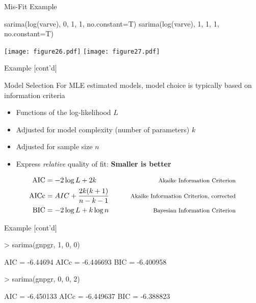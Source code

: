 \documentclass[ignorenonframetext,xcolor=x11names]{beamer}
\begin{document}
\begin{frame}[fragile]{Mis-Fit Example}
\begin{Rcode}
sarima(log(varve), 0, 1, 1, no.constant=T)
sarima(log(varve), 1, 1, 1, no.constant=T)
\end{Rcode}
\begin{center}
\texttt{[image: figure26.pdf]}
\texttt{[image: figure27.pdf]}
\end{center}
\end{frame}

\begin{frame}[fragile]{Example \small [cont'd]}
\begin{block}{Model Selection}
For MLE estimated models, model choice is typically based on information criteria
\begin{itemize}
   \item Functions of the log-likelihood $L$
   \item Adjusted for model complexity (number of parameters) $k$
   \item Adjusted for sample size $n$
   \item Express \emph{relative} quality of fit: \textbf{Smaller is better}
\end{itemize}
\begin{align*}
\operatorname{AIC} &= -2 \log L + 2k  &\qquad \text{\footnotesize Akaike Information Criterion}\\
\operatorname{AICc} &= AIC + \frac{2k(k+1)}{n-k-1} &\qquad \text{\footnotesize Akaike Information Criterion, corrected}\\
\operatorname{BIC} &= -2 \log L + k \log n &\qquad \text{\footnotesize Bayesian Information Criterion}
\end{align*}
\end{block}
\end{frame}

\begin{frame}[fragile]{Example \small [cont'd]}
\begin{textcode}
> sarima(gnpgr, 1, 0, 0)

AIC = -6.44694  AICc = -6.446693  BIC = -6.400958 
\end{textcode}

\begin{textcode}
> sarima(gnpgr, 0, 0, 2)

AIC = -6.450133  AICc = -6.449637  BIC = -6.388823 
\end{textcode}
\end{frame}
\end{document}
